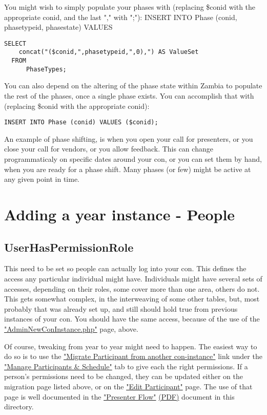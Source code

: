 \documentclass[captions=tablesignature]{scrartcl}
\begin{document}
You might wish to simply populate your phases with (replacing
\$conid with the appropriate conid, and the last "," with ";"):
INSERT INTO Phase (conid, phasetypeid, phasestate) VALUES
\begin{verbatim}
SELECT
    concat("($conid,",phasetypeid,",0),") AS ValueSet
  FROM
      PhaseTypes;
\end{verbatim}
You can also depend on the altering of the phase state within
Zambia to populate the rest of the phases, once a single phase
exists. You can accomplish that with (replacing \$conid with the
appropriate conid):
\begin{verbatim}
INSERT INTO Phase (conid) VALUES ($conid);
\end{verbatim}

An example of phase shifting, is when you open your call for
presenters, or you close your call for vendors, or you allow
feedback.  This can change programmaticaly on specific dates around
your con, or you can set them by hand, when you are ready for a
phase shift.  Many phases (or few) might be active at any given
point in time.

\section{Adding a year instance - People}
\label{sec-12}
\subsection{UserHasPermissionRole}
\label{sec-12-1}

This need to be set so people can actually log into your con.  This
defines the access any particular individual might have.
Individuals might have several sets of accesses, depending on their
roles, some cover more than one area, others do not.  This gets
somewhat complex, in the interweaving of some other tables, but,
most probably that was already set up, and still should hold true from
previous instances of your con.  You should have the same access,
because of the use of the \href{../webpages/AdminNewConInstance.php}{"AdminNewConInstance.php"} page, above.

Of course, tweaking from year to year might need to happen.  The
easiest way to do so is to use the 
\href{../webpages/StaffEditCreateParticipant.php?action=migrate}{"Migrate Participant from another con-instance"} link under the
\href{../webpages/StaffManageParticipants.php}{"Manage Participants \& Schedule"} tab  
to give each the right permissions. If a person's permissions need
to be changed, they can be updated either on the migration page
listed above, or on the \href{../webpages/StaffEditCreateParticipant.php?action=edit}{"Edit Participant"} page. The use of that
page is well documented in the \href{./Presenter_Flow.html}{"Presenter Flow"} \href{./Presenter_Flow.pdf}{(PDF)} document in
this directory.
\end{document}
